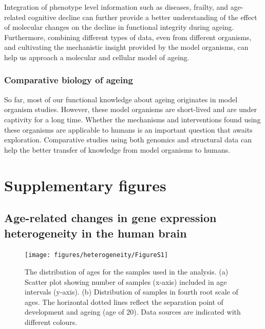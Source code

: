 \documentclass[12pt,twoside]{unicam}
\begin{document}
Integration of phenotype level information such as diseases, frailty, and age-related cognitive decline can further provide a better understanding of the effect of molecular changes on the decline in functional integrity during ageing. Furthermore, combining different types of data, even from different organisms, and cultivating the mechanistic insight provided by the model organisms, can help us approach a molecular and cellular model of ageing.

\hypertarget{comparative-biology-of-ageing}{%
\subsection{Comparative biology of ageing}\label{comparative-biology-of-ageing}}

So far, most of our functional knowledge about ageing originates in model organism studies. However, these model organisms are short-lived and are under captivity for a long time. Whether the mechanisms and interventions found using these organisms are applicable to humans is an important question that awaits exploration. Comparative studies using both genomics and structural data can help the better transfer of knowledge from model organisms to humans.

\appendix

\hypertarget{supplementary-figures}{%
\chapter{Supplementary figures}\label{supplementary-figures}}

\hypertarget{age-related-changes-in-gene-expression-heterogeneity-in-the-human-brain}{%
\section{Age-related changes in gene expression heterogeneity in the human brain}\label{age-related-changes-in-gene-expression-heterogeneity-in-the-human-brain}}

\begin{figure}

{\centering \texttt{[image: figures/heterogeneity/FigureS1]} 

}

\caption[Age distribution of individual datasets,]{The distribution of ages for the samples used in the analysis. (a) Scatter plot showing number of samples (x-axis) included in age intervals (y-axis). (b) Distribution of samples in fourth root scale of ages. The horizontal dotted lines reflect the separation point of development and ageing (age of 20). Data sources are indicated with different colours.}\label{fig:hetFigS1}
\end{figure}
\end{document}

